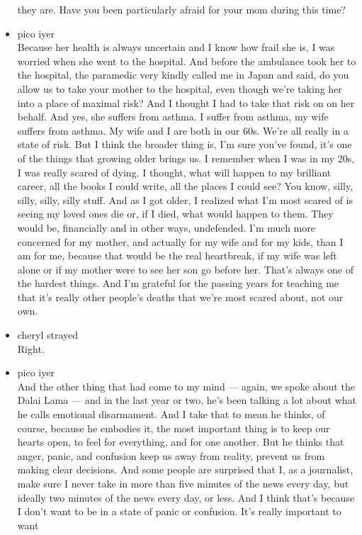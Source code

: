 \begin{itemize}
  they are. Have you been particularly afraid for your mom during this
  time?
\item
  pico iyer\\
  Because her health is always uncertain and I know how frail she is, I
  was worried when she went to the hospital. And before the ambulance
  took her to the hospital, the paramedic very kindly called me in Japan
  and said, do you allow us to take your mother to the hospital, even
  though we're taking her into a place of maximal risk? And I thought I
  had to take that risk on on her behalf. And yes, she suffers from
  asthma. I suffer from asthma, my wife suffers from asthma. My wife and
  I are both in our 60s. We're all really in a state of risk. But I
  think the broader thing is, I'm sure you've found, it's one of the
  things that growing older brings us. I remember when I was in my 20s,
  I was really scared of dying. I thought, what will happen to my
  brilliant career, all the books I could write, all the places I could
  see? You know, silly, silly, silly, silly stuff. And as I got older, I
  realized what I'm most scared of is seeing my loved ones die or, if I
  died, what would happen to them. They would be, financially and in
  other ways, undefended. I'm much more concerned for my mother, and
  actually for my wife and for my kids, than I am for me, because that
  would be the real heartbreak, if my wife was left alone or if my
  mother were to see her son go before her. That's always one of the
  hardest things. And I'm grateful for the passing years for teaching me
  that it's really other people's deaths that we're most scared about,
  not our own.
\item
  cheryl strayed\\
  Right.
\item
  pico iyer\\
  And the other thing that had come to my mind --- again, we spoke about
  the Dalai Lama --- and in the last year or two, he's been talking a
  lot about what he calls emotional disarmament. And I take that to mean
  he thinks, of course, because he embodies it, the most important thing
  is to keep our hearts open, to feel for everything, and for one
  another. But he thinks that anger, panic, and confusion keep us away
  from reality, prevent us from making clear decisions. And some people
  are surprised that I, as a journalist, make sure I never take in more
  than five minutes of the news every day, but ideally two minutes of
  the news every day, or less. And I think that's because I don't want
  to be in a state of panic or confusion. It's really important to want

\end{itemize}
